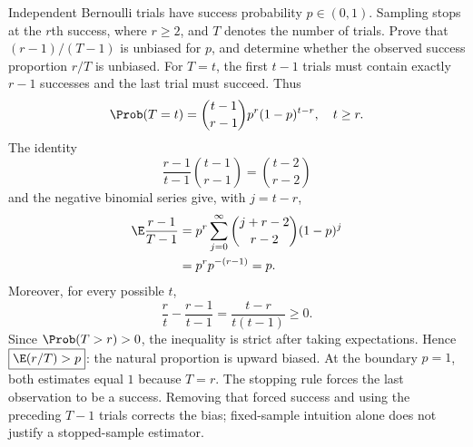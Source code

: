 Independent Bernoulli trials have success probability $p\in(0,1)$. Sampling stops at the $r$th success, where $r\ge2$, and $T$ denotes the number of trials. Prove that $(r-1)/(T-1)$ is unbiased for $p$, and determine whether the observed success proportion $r/T$ is unbiased.
\solution For $T=t$, the first $t-1$ trials must contain exactly $r-1$ successes and the last trial must succeed. Thus
\[
\Prob(T=t)=\binom{t-1}{r-1}p^r(1-p)^{t-r},\quad t\ge r.
\]
The identity
\[
\frac{r-1}{t-1}\binom{t-1}{r-1}=\binom{t-2}{r-2}
\]
and the negative binomial series give, with $j=t-r$,
\[
\begin{aligned}
\E\frac{r-1}{T-1}
&=p^r\sum_{j=0}^\infty\binom{j+r-2}{r-2}(1-p)^j\\
&=p^r p^{-(r-1)}=p.
\end{aligned}
\]
Moreover, for every possible $t$,
\[
\frac rt-\frac{r-1}{t-1}=\frac{t-r}{t(t-1)}\ge0.
\]
Since $\Prob(T>r)>0$, the inequality is strict after taking expectations. Hence $\boxed{\E(r/T)>p}$: the natural proportion is upward biased. At the boundary $p=1$, both estimates equal $1$ because $T=r$.
\insight The stopping rule forces the last observation to be a success. Removing that forced success and using the preceding $T-1$ trials corrects the bias; fixed-sample intuition alone does not justify a stopped-sample estimator.
